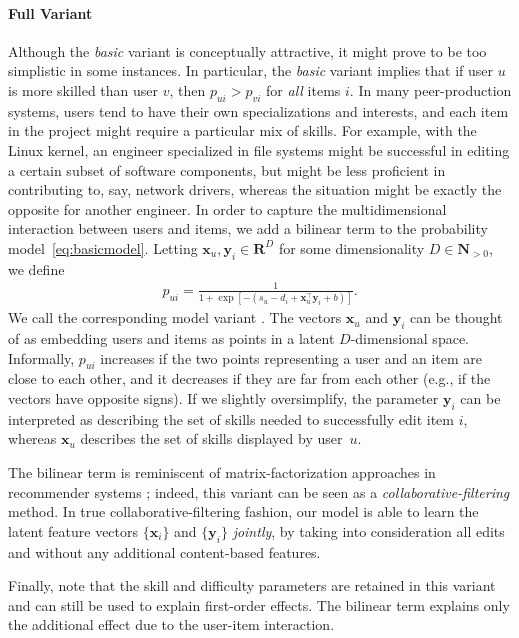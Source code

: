 \documentclass[format=sigconf]{acmart}
\newcommand{\interank}[1]{%
\ifthenelse{\isempty{#1}}{\textsc{interank}}{\textsc{interank} \emph{#1}}}
\begin{document}
\paragraph{Full Variant}
Although the \emph{basic} variant is conceptually attractive, it might prove to be too simplistic in some instances.
In particular, the \emph{basic} variant implies that if user $u$ is more skilled than user $v$, then $p_{ui} > p_{vi}$ for \emph{all} items $i$.
In many peer-production systems, users tend to have their own specializations and interests, and each item in the project might require a particular mix of skills.
For example, with the Linux kernel, an engineer specialized in file systems might be successful in editing a certain subset of software components, but might be less proficient in contributing to, say, network drivers, whereas the situation might be exactly the opposite for another engineer.
In order to capture the multidimensional interaction between users and items, we add a bilinear term to the probability model~\eqref{eq:basicmodel}.
Letting $\bm{x}_u, \bm{y}_i \in \mathbf{R}^D$ for some dimensionality $D \in \mathbf{N}_{>0}$, we define
\begin{align}
\label{eq:fullmodel}
p_{ui} = \frac{1}{1 + \exp[-(s_u - d_i + \bm{x}_u^\top \bm{y}_i + b)]}.
\end{align}
We call the corresponding model variant \interank{full}.
The vectors $\bm{x}_u$ and $\bm{y}_i$ can be thought of as embedding users and items as points in a latent $D$-dimensional space.
Informally, $p_{ui}$ increases if the two points representing a user and an item are close to each other, and it decreases if they are far from each other (e.g., if the vectors have opposite signs).
If we slightly oversimplify, the parameter $\bm{y}_i$ can be interpreted as describing the set of skills needed to successfully edit item $i$, whereas $\bm{x}_u$ describes the set of skills displayed by user~$u$.

The bilinear term is reminiscent of matrix-factorization approaches in recommender systems \citep{koren2009matrix};
indeed, this variant can be seen as a \emph{collaborative-filtering} method.
In true collaborative-filtering fashion, our model is able to learn the latent feature vectors $\{ \bm{x}_i \}$ and $\{ \bm{y}_i \}$ \emph{jointly}, by taking into consideration all edits and without any additional content-based features.

Finally, note that the skill and difficulty parameters are retained in this variant and can still be used to explain first-order effects.
The bilinear term explains only the additional effect due to the user-item interaction.
\end{document}

